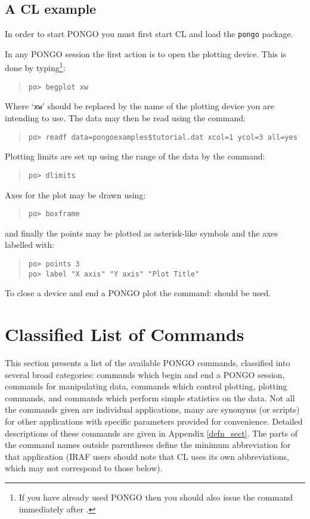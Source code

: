 \subsection{A CL example}

In order to start PONGO you must first start CL and load the
\verb+pongo+ package.

In any PONGO session the first action is to open the plotting device.
This is done by typing\footnote{ If you have already used PONGO then
you should also issue the  command immediately
after .}:
\begin{quote}
\begin{verbatim}
po> begplot xw
\end{verbatim}
\end{quote}
Where `\verb+xw+' should be replaced by the name of the plotting device you
are intending to use. The data may then be read using the command:
\begin{quote}
\begin{verbatim}
po> readf data=pongoexamples$tutorial.dat xcol=1 ycol=3 all=yes
\end{verbatim}
\end{quote}
Plotting limits are set up using the range of the data by the command:
\begin{quote}
\begin{verbatim}
po> dlimits
\end{verbatim}
\end{quote}
Axes for the plot may be drawn using:
\begin{quote}
\begin{verbatim}
po> boxframe
\end{verbatim}
\end{quote}
and finally the points may be plotted as asterisk-like symbols and the axes
labelled with:
\begin{quote}
\begin{verbatim}
po> points 3
po> label "X axis" "Y axis" "Plot Title"
\end{verbatim}
\end{quote}
To close a device and end a PONGO plot the command:
 should be used.

\section{Classified List of Commands}

This section presents a list of the available PONGO commands,
classified into several broad categories: commands which begin and end
a PONGO session, commands for manipulating data, commands which
control plotting, plotting commands, and commands which perform simple
statistics on the data.  Not all the commands given are individual
applications, many are synonyms (or scripts) for other applications
with specific parameters provided for convenience.  Detailed
descriptions of these commands are given in Appendix \ref{defn_sect}.
The parts of the command names outside parentheses define the minimum
abbreviation for that application (IRAF users should note that CL uses
its own abbreviations, which may not correspond to those below).


